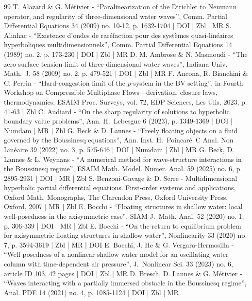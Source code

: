 \begin{thebibliography}{99}
T. Alazard \& G. Métivier - “Paralinearization of the Dirichlet to Neumann operator, and regularity of three-dimensional water waves”, Comm. Partial Differential Equations 34 (2009) no. 10-12, p. 1632-1704 | DOI | Zbl | MR
S. Alinhac - “Existence d’ondes de raréfaction pour des systèmes quasi-linéaires hyperboliques multidimensionnels”, Comm. Partial Differential Equations 14 (1989) no. 2, p. 173-230 | DOI | Zbl | MR
D. M. Ambrose \& N. Masmoudi - “The zero surface tension limit of three-dimensional water waves”, Indiana Univ. Math. J. 58 (2009) no. 2, p. 479-521 | DOI | Zbl | MR
F. Ancona, R. Bianchini \& C. Perrin - “Hard-congestion limit of the $p$-system in the BV setting”, in Fourth Workshop on Compressible Multiphase Flows—derivation, closure laws, thermodynamics, ESAIM Proc. Surveys, vol. 72, EDP Sciences, Les Ulis, 2023, p. 41-63 | Zbl
C. Audiard - “On the sharp regularity of solutions to hyperbolic boundary value problems”, Ann. H. Lebesgue 6 (2023), p. 1349-1369 | DOI | Numdam | MR | Zbl
G. Beck \& D. Lannes - “Freely floating objects on a fluid governed by the Boussinesq equations”, Ann. Inst. H. Poincaré C Anal. Non Linéaire 39 (2022) no. 3, p. 575-646 | DOI | Numdam | Zbl | MR
G. Beck, D. Lannes \& L. Weynans - “A numerical method for wave-structure interactions in the Boussinesq regime”, ESAIM Math. Model. Numer. Anal. 59 (2025) no. 6, p. 2895-2931 | DOI | MR | Zbl
S. Benzoni-Gavage \& D. Serre - Multidimensional hyperbolic partial differential equations. First-order systems and applications, Oxford Math. Monographs, The Clarendon Press, Oxford University Press, Oxford, 2007 | MR | Zbl
E. Bocchi - “Floating structures in shallow water: local well-posedness in the axisymmetric case”, SIAM J. Math. Anal. 52 (2020) no. 1, p. 306-339 | DOI | MR | Zbl
E. Bocchi - “On the return to equilibrium problem for axisymmetric floating structures in shallow water”, Nonlinearity 33 (2020) no. 7, p. 3594-3619 | Zbl | MR | DOI
E. Bocchi, J. He \& G. Vergara-Hermosilla - “Well-posedness of a nonlinear shallow water model for an oscillating water column with time-dependent air pressure”, J. Nonlinear Sci. 33 (2023) no. 6, article ID 103, 42 pages | DOI | Zbl | MR
D. Bresch, D. Lannes \& G. Métivier - “Waves interacting with a partially immersed obstacle in the Boussinesq regime”, Anal. PDE 14 (2021) no. 4, p. 1085-1124 | DOI | Zbl | MR

\end{thebibliography}

